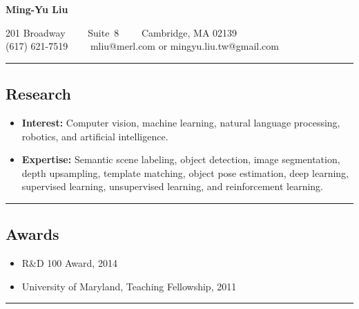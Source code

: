 \documentclass[10pt,letterpaper]{article}
\begin{document}
\begin{center}
{\LARGE \textbf{Ming-Yu Liu}}

201 Broadway\ \ \textbullet
\ \ Suite\ 8\ \ \textbullet
\ \ Cambridge, MA 02139
\\
(617) 621-7519\ \ \textbullet
\ \ mliu@merl.com or mingyu.liu.tw@gmail.com
\end{center}

\hrule
\vspace{-0.4em}
\subsection*{Research}
\begin{itemize}
\item {\bf Interest:} Computer vision, machine learning, natural language processing, robotics, and artificial intelligence.\vspace{-2mm}
\item {\bf Expertise:} Semantic scene labeling, object detection, image segmentation, depth upsampling, template matching, object pose estimation, deep learning, supervised learning, unsupervised learning, and reinforcement learning.
\end{itemize}

\hrule
\vspace{-0.4em}
\subsection*{Awards}
\begin{itemize}
\item R\&D 100 Award, 2014\vspace{-2mm}
\item University of Maryland, Teaching Fellowship, 2011
\end{itemize}

\hrule
\vspace{-0.4em}
\end{document}
